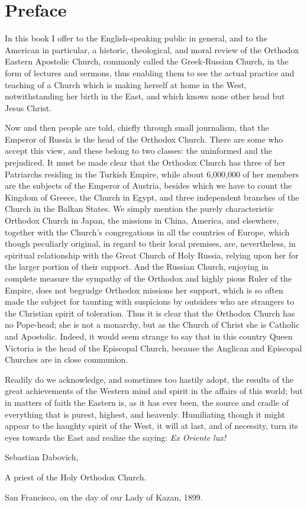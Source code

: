 \chapter*{Preface}

In this book I offer to the English-speaking public in general, and to the American in particular, a historic, theological, and moral review of the Orthodox Eastern Apostolic Church, commonly called the Greek-Russian Church, in the form of lectures and sermons, thus enabling them to see the actual practice and teaching of a Church which is making herself at home in the West, notwithstanding her birth in the East, and which knows none other head but Jesus Christ.

Now and then people are told, chiefly through small journalism, that the Emperor of Russia is the head of the Orthodox Church. There are some who accept this view, and these belong to two classes: the uninformed and the prejudiced. It must be made clear that the Orthodox Church has three of her Patriarchs residing in the Turkish Empire, while about 6,000,000 of her members are the subjects of the Emperor of Austria, besides which we have to count the Kingdom of Greece, the Church in Egypt, and three independent branches of the Church in the Balkan States. We simply mention the purely characteristic Orthodox Church in Japan, the missions in China, America, and elsewhere, together with the Church's congregations in all the countries of Europe, which though peculiarly original, in regard to their local premises, are, nevertheless, in spiritual relationship with the Great Church of Holy Russia, relying upon her for the larger portion of their support. And the Russian Church, enjoying in complete measure the sympathy of the Orthodox and highly pious Ruler of the Empire, does not begrudge Orthodox missions her support, which is so often made the subject for taunting with suspicions by outsiders who are strangers to the Christian spirit of toleration. Thus it is clear that the Orthodox Church has no Pope-head; she is not a monarchy, but as the Church of Christ she is Catholic and Apostolic. Indeed, it would seem strange to say that in this country Queen Victoria is the head of the Episcopal Church, because the Anglican and Episcopal Churches are in close communion.

Readily do we acknowledge, and sometimes too hastily adopt, the results of the great achievements of the Western mind and spirit in the affairs of this world; but in matters of faith the Eastern is, as it has ever been, the source and cradle of everything that is purest, highest, and heavenly. Humiliating though it might appear to the haughty spirit of the West, it will at last, and of necessity, turn its eyes towards the East and realize the saying: \textit{Ex Oriente lux!}

Sebastian Dabovich,

A priest of the Holy Orthodox Church.

San Francisco, on the day of our Lady of Kazan, 1899.
